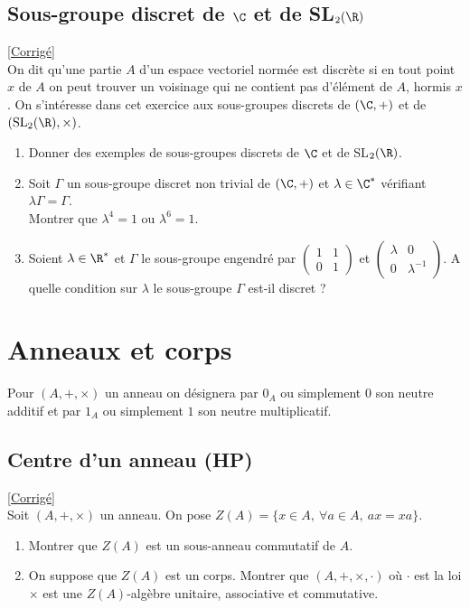 \documentclass[8pt]{book}
\begin{document}
	\section{Sous-groupe discret de $\C$ et de SL$_2(\R)$ }
	\label{Sous-groupe discret de C et de SL2(R)}
	\textcolor{blue}{\hyperref[Sous-groupe discret de C et de SL2(R) corrigé]{[Corrigé]}}\\
	On dit qu'une partie $A$ d'un espace vectoriel normée est discrète si en tout point $x$ de $A$ on peut trouver un voisinage qui ne contient pas d'élément de $A$, hormis $x$. On s'intéresse dans cet exercice aux sous-groupes discrets de $(\C,+)$ et de $(\text{SL}_2(\R),\times)$.
	\begin{enumerate}
		\item Donner des exemples de sous-groupes discrets de $\C$ et de SL$_2(\R)$.
		\item Soit $\Gamma$ un sous-groupe discret non trivial de $(\C,+)$ et $\lambda\in \C^*$ vérifiant $\lambda\Gamma=\Gamma$.\\
		Montrer que $\lambda^4=1$ ou $\lambda^6=1$.
		\item Soient $\lambda\in \R^*$ et $\Gamma$ le sous-groupe engendré par $\begin{pmatrix}1&1\\0&1\end{pmatrix}$ et $\begin{pmatrix}\lambda&0\\0&\lambda^{-1}\end{pmatrix}$. A quelle condition sur $\lambda$ le sous-groupe $\Gamma$ est-il discret ?
	\end{enumerate}
	
\chapter{Anneaux et corps}
	Pour $(A,+,\times)$ un anneau on désignera par $0_A$ ou simplement $0$ son neutre additif et par $1_A$ ou simplement $1$ son neutre multiplicatif.\\
	
	\section{Centre d'un anneau  (HP)}
	\label{Centre d'un anneau}
	\textcolor{blue}{\hyperref[Centre d'un anneau corrigé]{[Corrigé]}}\\
	Soit $(A,+,\times)$ un anneau. On pose $Z(A)=\{x\in A,\ \forall a\in A,\ ax=xa\}$.
	\begin{enumerate}
		\item Montrer que $Z(A)$ est un sous-anneau commutatif de $A$.
		\item On suppose que $Z(A)$ est un corps. Montrer que $(A,+,\times,\cdot)$ où $\cdot$ est la loi $\times$ est une $Z(A)$-algèbre unitaire, associative et commutative.
	\end{enumerate}
	
\end{document}
